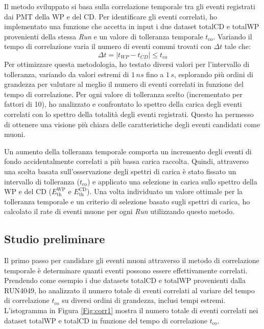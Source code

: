 Il metodo sviluppato si basa sulla correlazione temporale tra gli eventi registrati dai PMT della WP e del CD. Per identificare gli eventi correlati, ho implementato una funzione che accetta in input i due dataset totalCD e totalWP provenienti della stessa \textit{Run} e un valore di tolleranza temporale $t_\text{co}$. Variando il tempo di correlazione varia il numero di eventi comuni trovati con $\Delta t$ tale che:
\begin{equation}
    \Delta t = |t_{WP} - t_{CD}|\le t_\text{co}
    \label{eq:diff}
\end{equation}
Per ottimizzare questa metodologia, ho testato diversi valori per l'intervallo di tolleranza, variando da valori estremi di $1\,\unit{ns}$ fino a $1\,\unit{s}$, esplorando più ordini di grandezza per valutare al meglio il numero di eventi correlati in funzione del tempo di correlazione. Per ogni valore di tolleranza scelto (incrementato per fattori di 10), ho analizzato e confrontato lo spettro della carica degli eventi correlati con lo spettro della totalità degli eventi registrati. Questo ha permesso di ottenere una visione più chiara delle caratteristiche degli eventi candidati come muoni.

Un aumento della tolleranza temporale comporta un incremento degli eventi di fondo accidentalmente correlati a più bassa carica raccolta. Quindi, attraverso una scelta basata sull'osservazione degli spettri di carica è stato fissato un intervallo di tolleranza ($t_\text{co}$) e  applicato una selezione in carica sullo spettro della WP e del CD ($E^\text{WP}_\text{th}$ e $E^\text{CD}_\text{th}$). Una volta individuato un valore ottimale per la tolleranza temporale e un criterio di selezione basato sugli spettri di carica, ho calcolato il rate di eventi muone per ogni \textit{Run} utilizzando questo metodo.
\subsection{Studio preliminare}
Il primo passo per candidare gli eventi muoni attraverso il metodo di correlazione temporale è determinare quanti eventi possono essere effettivamente correlati. Prendendo come esempio i due datasets totalCD e totalWP provenienti dalla RUN4049, ho analizzato il numero totale di eventi correlati al variare del tempo di correlazione $t_\text{co}$ su diversi ordini di grandezza, inclusi tempi estremi. L'istogramma in Figura \ref{Fig:corr1} mostra il numero totale di eventi correlati nei dataset totalWP e totalCD in funzione del tempo di correlazione $t_\text{co}$.

